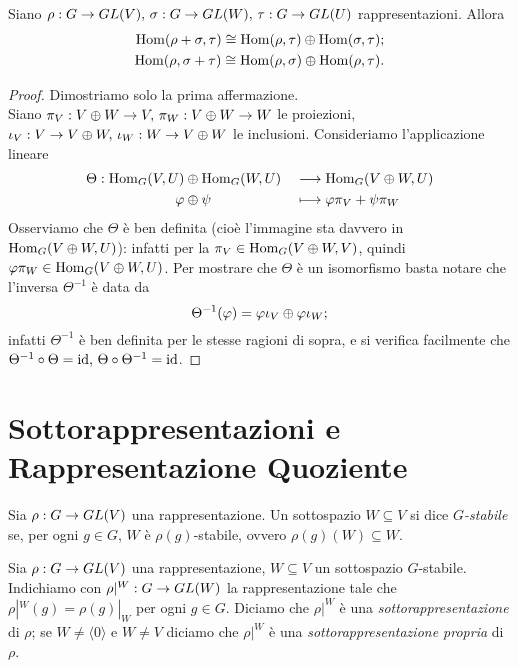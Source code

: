 \begin{proposition}
Siano $\rho:G\to GL(V),\,\allowbreak\sigma:G\to GL(W),\,\allowbreak\tau:G\to GL(U)$ rappresentazioni. Allora
\begin{align*}
\operatorname{Hom}(\rho+\sigma,\tau)\cong\operatorname{Hom}(\rho,\tau)\oplus\operatorname{Hom}(\sigma,\tau);\\
\operatorname{Hom}(\rho,\sigma+\tau)\cong\operatorname{Hom}(\rho,\sigma)\oplus\operatorname{Hom}(\rho,\tau).
\end{align*}
\end{proposition}
\begin{proof}
Dimostriamo solo la prima affermazione.\\
Siano $\pi_V:V\oplus W\to V,\,\allowbreak\pi_W:V\oplus W\to W$ le proiezioni, $\iota_V:V\to V\oplus W,\,\allowbreak\iota_W:W\to V\oplus W$ le inclusioni. Consideriamo l'applicazione lineare
\begin{alignat*}{2}
\Theta:\operatorname{Hom}_G(V,U)&\oplus\operatorname{Hom}_G(W,U)&&\longrightarrow\operatorname{Hom}_G(V\oplus W,U)\\
\varphi&\oplus\psi&&\longmapsto\varphi\pi_V+\psi\pi_W
\end{alignat*}
Osserviamo che $\Theta$ è ben definita (cioè l'immagine sta davvero in $\operatorname{Hom}_G(V\oplus W,U)$): infatti per la  $\pi_V\in\operatorname{Hom}_G(V\oplus W,V)$, quindi $\varphi\pi_W\in\operatorname{Hom}_G(V\oplus W,U)$. Per mostrare che $\Theta$ è un isomorfismo basta notare che l'inversa $\Theta^{-1}$ è data da
$$
\Theta^{-1}(\varphi)=\varphi\iota_V\oplus\varphi\iota_W;
$$
infatti $\Theta^{-1}$ è ben definita per le stesse ragioni di sopra, e si verifica facilmente che $\Theta^{-1}\circ\Theta=\operatorname{id},\,\allowbreak\Theta\circ\Theta^{-1}=\operatorname{id}$.
\end{proof}

\section{Sottorappresentazioni e Rappresentazione Quoziente}

\begin{definition}
Sia $\rho:G\to GL(V)$ una rappresentazione. Un sottospazio $W\subseteq V$ si dice \emph{$G$-stabile} se, per ogni $g\in G$, $W$ è $\rho(g)$-stabile, ovvero $\rho(g)(W)\subseteq W$.
\end{definition}

\begin{definition}
Sia $\rho:G\to GL(V)$ una rappresentazione, $W\subseteq V$ un sottospazio $G$-stabile. Indichiamo con $\rho|^W:G\to GL(W)$ la rappresentazione tale che $\rho|^W(g)=\rho(g)|_W$ per ogni $g\in G$. Diciamo che $\rho|^W$ è una \emph{sottorappresentazione} di $\rho$; se $W\neq\langle0\rangle$ e $W\neq V$ diciamo che $\rho|^W$ è una \emph{sottorappresentazione propria} di $\rho$.
\end{definition}

